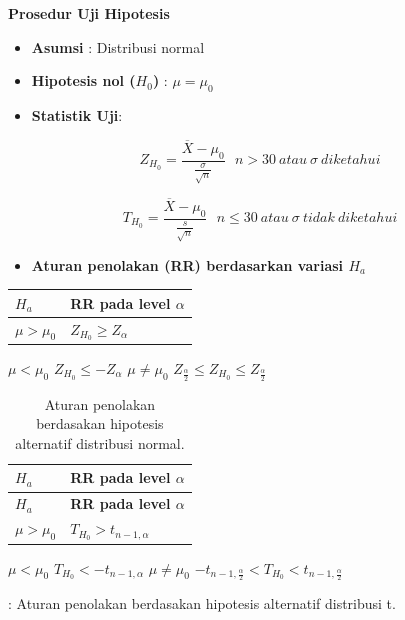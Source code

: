 \documentclass[]{book}
\providecommand{\tightlist}{%
  \setlength{\itemsep}{0pt}\setlength{\parskip}{0pt}}
\begin{document}
\textbf{Prosedur Uji Hipotesis}

\begin{itemize}
\tightlist
\item
  \textbf{Asumsi} : Distribusi normal
\item
  \textbf{Hipotesis nol (\(H_0\))} : \(\mu=\mu_0\)
\item
  \textbf{Statistik Uji}:
\end{itemize}

\begin{equation}
  Z_{H_0}=\frac{\overline{X}-\mu_0}{\frac{\sigma}{\sqrt{n}}}\ \ \ n>30\ atau\ \sigma\ diketahui
  \label{eq:stparam}
\end{equation}

\begin{equation}
  T_{H_0}=\frac{\overline{X}-\mu_0}{\frac{s}{\sqrt{n}}}\ \ \ n\le30\ atau\ \sigma\ tidak\ diketahui
  \label{eq:stparam2}
\end{equation}

\begin{itemize}
\tightlist
\item
  \textbf{Aturan penolakan (RR) berdasarkan variasi \(H_a\)}
\end{itemize}

\begin{longtable}[]{@{}ll@{}}
\toprule
\textbf{\(H_a\)} & \textbf{RR pada level \(\alpha\)}\tabularnewline
\midrule
\endhead
\(\mu>\mu_0\) & \(Z_{H_0}\ge Z_\alpha\)\tabularnewline
\bottomrule
\end{longtable}

\(\mu<\mu_0\) \textbar{} \(Z_{H_0}\le -Z_\alpha\) \(\mu\neq\mu_0\)
\textbar{} \(Z_{\frac{\alpha}{2}} \le Z_{H_0}\le Z_{\frac{\alpha}{2}}\)

\begin{longtable}[]{@{}ll@{}}
\caption{\label{tab:stha} Aturan penolakan berdasakan hipotesis alternatif
distribusi normal.}\tabularnewline
\toprule
\textbf{\(H_a\)} & \textbf{RR pada level \(\alpha\)}\tabularnewline
\midrule
\endfirsthead
\toprule
\textbf{\(H_a\)} & \textbf{RR pada level \(\alpha\)}\tabularnewline
\midrule
\endhead
\(\mu>\mu_0\) & \(T_{H_0}>t_{n-1,\alpha}\)\tabularnewline
\bottomrule
\end{longtable}

\(\mu<\mu_0\) \textbar{} \(T_{H_0}< -t_{n-1,\alpha}\) \(\mu\neq\mu_0\)
\textbar{}
\(-t_{n-1,\frac{\alpha}{2}}<T_{H_0}< t_{n-1,\frac{\alpha}{2}}\)

: \label{tab:stha1} Aturan penolakan berdasakan hipotesis alternatif
distribusi t.
\end{document}
